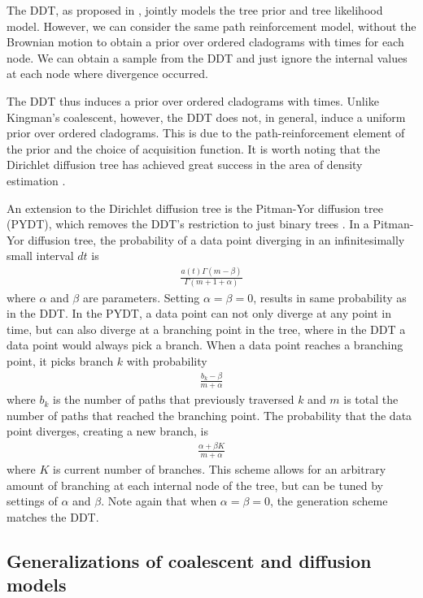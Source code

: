 The DDT, as proposed in \citet{Neal2003}, 
jointly models the tree prior and tree likelihood model.
However, we can consider the same
path reinforcement model, without the Brownian motion
to obtain a prior over ordered cladograms
with times for each node.
We can obtain a sample from the DDT and just ignore the
internal values at each node where divergence occurred.

The DDT thus induces a prior over ordered cladograms
with times.
Unlike Kingman's coalescent, however, the DDT
does not, in general, induce a uniform prior over ordered cladograms.
This is due to the path-reinforcement element
of the prior and the choice of acquisition function.
It is worth noting that the Dirichlet diffusion tree has achieved
great success in the area of density estimation \citep{Adams2008}.

An extension to the Dirichlet diffusion tree
is the Pitman-Yor diffusion tree (PYDT),
which removes the DDT's restriction to just binary trees
\citep{Knowles2015}.
In a Pitman-Yor diffusion tree, the probability
of a data point diverging in an infinitesimally small
interval $dt$ is
\begin{align}
  \frac{a(t)\Gamma(m - \beta)}{\Gamma(m + 1 + \alpha)}
\end{align}
where $\alpha$ and $\beta$ are parameters. Setting $\alpha = \beta = 0$,
results in same probability as in the DDT.
In the PYDT, a data point can not only
diverge at any point in time,
but can also diverge at a branching point
in the tree, where in the DDT
a data point would always pick a branch.
When a data point reaches a branching point,
it picks branch $k$
with probability
\begin{align}
  \frac{b_k - \beta}{m + \alpha}
\end{align}
where $b_k$ is the number of paths
that previously traversed $k$
and $m$ is total the number of paths
that reached the branching point.
The probability that the data point
diverges, creating a new branch, is
\begin{align}
  \frac{\alpha + \beta K}{m + \alpha}
\end{align}
where $K$ is current number of branches.
This scheme allows for an arbitrary amount of
branching at each internal node of the tree,
but can be tuned by settings of $\alpha$ and $\beta$.
Note again that when $\alpha = \beta = 0$,
the generation scheme matches the DDT.

\subsection{Generalizations of coalescent and diffusion models}

